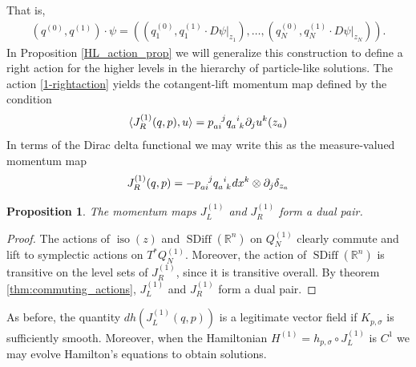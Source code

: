 \documentclass[12pt]{amsart}
\newcommand{\je}[1]{\todo[inline,color=green!20]{JE:  #1}}
\newcommand{\R}{\ensuremath{\mathbb{R}}}
\newtheorem{prop}[thm]{Proposition}
\DeclareMathOperator{\SDiff}{SDiff}
\DeclareMathOperator{\iso}{iso}
\begin{document}
	 That is, 
 \begin{align}
	 (q^{(0)}, q^{(1)}) \cdot \psi = \left( \left(q_1^{(0)}, q_1^{(1)} \cdot D\psi|_{z_1}\right), \ldots, \left(q_N^{(0)}, q_N^{(1)} \cdot D\psi|_{z_N}\right)\right). \label{1-rightaction}
\end{align}
In Proposition \ref{HL_action_prop} we will generalize this construction to define a right action for the higher levels in the hierarchy of particle-like solutions.
  The action \eqref{1-rightaction} yields the cotangent-lift momentum map defined by the condition
  \begin{align*}
    \langle J_R^{(1)}(q,p) , u \rangle = p\indices{_a_i^j} q\indices{_a^i_k} \partial_j u^k(z_a)
  \end{align*}
  In terms of the Dirac delta functional we may write this as the measure-valued momentum map
  \begin{align*}
    J_R^{(1)}(q,p) = - p\indices{_a_i^j} q\indices{_a^i_k} dx^k \otimes \partial_j \delta_{z_a}
  \end{align*}
  \begin{prop}
    The momentum maps $J_L^{(1)}$ and $J_R^{(1)}$ form a dual pair.
  \end{prop}
  \begin{proof}
    The actions of $\iso(z)$ and $\SDiff(\R^n)$ on $Q_N^{(1)}$
    clearly commute
    and lift to symplectic actions on $T^*Q_N^{(1)}$.
    Moreover, the action of $\SDiff(\R^n)$ is transitive on the level sets of $J_R^{(1)}$, since it is transitive overall.
    By theorem \ref{thm:commuting_actions}, $J_L^{(1)}$ and $J_R^{(1)}$ form a dual pair.
  \end{proof}

  As before, the quantity $dh( J_L^{(1)}(q,p))$ is a legitimate vector field
  if $K_{p,\sigma}$ is sufficiently smooth.  Moreover, when the Hamiltonian
  $H^{(1)} = h_{p,\sigma} \circ J_L^{(1)}$ is $C^1$ we may evolve Hamilton's equations
  to obtain solutions.
\end{document}
